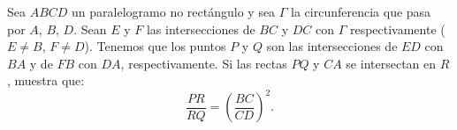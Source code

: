 Sea $ABCD$ un paralelogramo no rectángulo y sea $\Gamma$ la circunferencia que pasa por $A$, $B$, $D$. Sean $E$ y $F$ las intersecciones de $BC$ y $DC$ con $\Gamma$ respectivamente ($E\neq B$, $F\neq D$). Tenemos que los puntos $P$ y $Q$ son las intersecciones de $ED$ con $BA$ y de $FB$ con $DA$, respectivamente. Si las rectas $PQ$ y $CA$ se intersectan en $R$, muestra que:
\[\frac{PR}{RQ}=\left(\frac{BC}{CD}\right)^2.\]